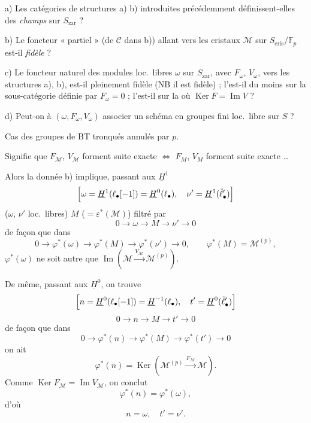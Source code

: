 \documentclass[11pt,a4paper]{article}
\begin{document}

a) Les catégories de structures a) b) introduites précédemment
définissent-elles des \emph{champs} sur $S_{\mathrm{zar}}$ ?

b) Le foncteur «  partiel » (de $\mathcal{C}$ dans b))
allant vers les cristaux $\mathcal{M}$ sur $S_{\mathrm{cris}}/\mathbb{F}_p$
est-il \emph{fidèle} ?

c) Le foncteur naturel  des modules loc.\ libres $\omega$ sur
$S_{\mathrm{zar}}$, avec $F_\omega$, $V_\omega$, vers les structures a), b),
est-il pleinement fidèle (NB il est fidèle) ; l'est-il du moins
 sur la sous-catégorie définie par $F_\omega = 0$ ;
l'est-il sur la  où $\operatorname{Ker} F = \operatorname{Im} V$ ?

d) Peut-on à $(\omega, F_\omega, V_\omega)$ associer un schéma en groupes
fini loc.\ libre sur $S$ ?



Cas des groupes de BT tronqués annulés par $p$.

Signifie que $F_{\mathcal{M}}$, $V_{\mathcal{M}}$ forment suite exacte
$\Longleftrightarrow$ $F_M$, $V_M$ forment suite exacte \ldots

Alors la donnée b) implique, passant aux $\underline{H}^1$
\[
\Bigl[\omega = \underline{H}^1(\ell_\bullet[-1]) = \underline{H}^0(\ell_\bullet),
\quad \nu' = \underline{H}^1(\check\ell'_\bullet)\Bigr]
\]
($\omega$, $\nu'$ loc.\ libres)
$M$ ($= \varepsilon^*(\mathcal{M})$) filtré par
\[
0 \to \omega \to M \to \nu' \to 0
\]
de façon que dans
\[
0 \to \varphi^*(\omega) \to \varphi^*(M) \to \varphi^*(\nu') \to 0, \qquad
\varphi^*(M) = \mathcal{M}^{(p)},
\]
$\varphi^*(\omega)$ ne soit autre que
$\operatorname{Im}(\mathcal{M} \xrightarrow{V_{\mathcal{M}}} \mathcal{M}^{(p)})$.


De même, passant aux $\underline{H}^0$, on trouve
\[
\Bigl[n = \underline{H}^0(\ell_\bullet[-1]) = \underline{H}^{-1}(\ell_\bullet),
\quad t' = \underline{H}^0(\check\ell'_\bullet)\Bigr]
\]
\[
0 \to n \to M \to t' \to 0
\]
de façon que dans
\[
0 \to \varphi^*(n) \to \varphi^*(M) \to \varphi^*(t') \to 0
\]
on ait
\[
\varphi^*(n) = \operatorname{Ker}(\mathcal{M}^{(p)} \xrightarrow{F_{\mathcal{M}}} \mathcal{M}) .
\]
Comme $\operatorname{Ker} F_{\mathcal{M}} = \operatorname{Im} V_{\mathcal{M}}$,
on conclut
\[
\varphi^*(n) = \varphi^*(\omega),
\]
d'où
\[
\boxed{n = \omega}, \quad \boxed{t' = \nu'} .
\]
\end{document}
